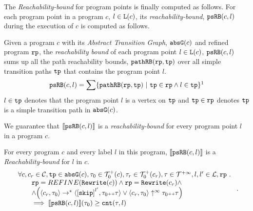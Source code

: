 The \emph{Reachability-bound} for program points is finally computed as follows.
For each program point in a program $c$, $l \in \mathtt{L}(c)$,
its \emph{reachability-bound}, $\mathtt{psRB}(c, l)$ during the execution of $c$ is computed as follows.
%
\begin{defn}
\label{def:point_psrb}
Given a program $c$ with its \emph{Abstract Transition Graph}, $\mathtt{abs}{\mathtt{G}}(c)$ and refined program $\mathtt{rp}$,
the \emph{reachability bound} of each program point $l \in \mathtt{L}(c)$, $\mathtt{psRB}(c, l)$ 
sums up all the path reachability bounds, $\mathtt{pathRB}(\mathtt{rp}, \mathtt{tp})$ over all simple transition paths $\mathtt{tp}$ that contains the program point $l$.
\[ 
  \psRB(c, l) = 
  \sum
  \left\{ \inoutB(\rprog, \tpath) ~\vert~ \tpath \in \rprog \land 
  l \in \tpath \right\}\footnotemark
\]
$l \in \mathtt{tp}$ denotes that the program point $l$ is a vertex on $\mathtt{tp}$ 
and $\mathtt{tp} \in \mathtt{rp}$ denotes $\mathtt{tp}$ is a simple transition path in $\mathtt{abs}{\mathtt{G}}(c)$.
\end{defn}
We guarantee that $\llbracket \mathtt{psRB}(c, l) \rrbracket$ is a \emph{reachability-bound} for every program point $l$ in a program $c$.
\begin{thm}
\label{thm:pathsensitive_rb_soundness}
For every program ${c}$ and every label $l$ in this program,
$\llbracket \mathtt{psRB}(c, l) \rrbracket$ is a \emph{Reachability-bound} for $l$ in $c$.
%
{\small
\[
  \begin{array}{l}
    \forall c, c_r \in \cdom, \tpath \in \absG(c), \trace_0 \in \ftdom_0(c),  \trace_r \in \ftdom_0(c_r), \trace \in \tdom, l, l' \in \ldom, \rprog \st 
    \\ \qquad
    \rprog = REFINE(\algrewrite(c))
    \land 
    \rprog = \algrewrite(c_r)
    \land
    \\ \qquad
    \land
    \Big(
    \config{c_r, \trace_0} \rightarrow^* \config{\clabel{\eskip}^{l'}, \trace_0 \tracecat \trace}
    \lor \config{c_r, \trace_0} \uparrow^{\infty} \trace_0 \tracecat \trace 
    \Big)
    \\ \qquad
    \implies \econfig{\psRB(c, l)}(\trace_0) \geq \counter(\trace, l)
  \end{array}.
\]
}
\end{thm}